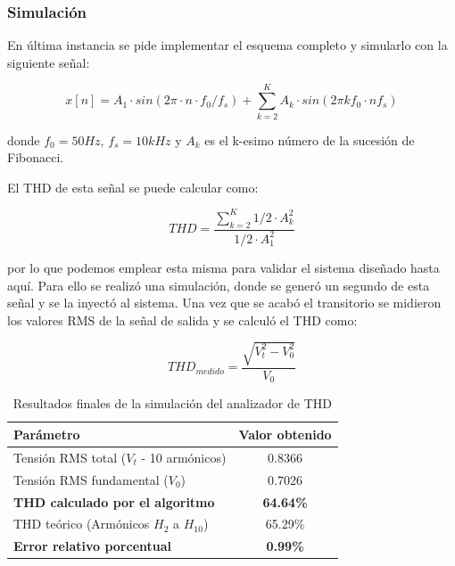 \subsubsection{Simulación}
En última instancia se pide implementar el esquema completo y simularlo con la siguiente señal:

\begin{equation}
x[n] = A_1 \cdot sin(2\pi \cdot n \cdot f_0/f_s) + \sum_{k=2}^K A_k \cdot sin(2\pi kf_0 \cdot nf_s)
\end{equation}

\noindent donde $f_0=50Hz$, $f_s=10kHz$ y $A_k$ es el k-esimo número de la sucesión de Fibonacci.

El THD de esta señal se puede calcular como:

\begin{equation}
    THD = \frac{\sum_{k=2}^K 1/2 \cdot A_k^2}{1/2 \cdot A_1^2}
\end{equation}

\noindent por lo que podemos emplear esta misma para validar el sistema diseñado hasta aquí. Para ello se realizó una simulación, donde se generó un segundo de esta señal y se la inyectó al sistema. Una vez que se acabó el transitorio se midieron los valores RMS de la señal de salida y se calculó el THD como:

\begin{equation}
    THD_{medido} = \frac{\sqrt{V_t^2 -V_0^2}}{V_0}
\end{equation}

\vspace{0.5cm}
\begin{table}[H]
\centering
\caption{Resultados finales de la simulación del analizador de THD}
\begin{tabular}{lc}
\toprule
\textbf{Parámetro} & \textbf{Valor obtenido} \\
\midrule
Tensión RMS total ($V_t$ - 10 armónicos) & 0.8366 \\
Tensión RMS fundamental ($V_0$) & 0.7026 \\
\midrule
\textbf{THD calculado por el algoritmo} & \textbf{64.64\%} \\
THD teórico (Armónicos $H_2$ a $H_{10}$) & 65.29\% \\
\midrule
\textbf{Error relativo porcentual} & \textbf{0.99\%} \\
\bottomrule
\end{tabular}
\label{tab:resultados_analizador}
\end{table}

